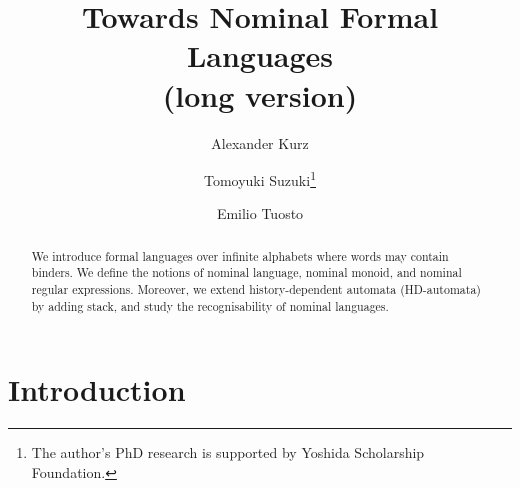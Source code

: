 \documentclass[runningheads,a4paper]{llncs}
\newcommand{\comment}[1]{}
\begin{document}
\mainmatter  

\title{Towards Nominal Formal Languages \\ (long version)}


\author{Alexander Kurz \and Tomoyuki Suzuki\thanks{The author's PhD research is supported by Yoshida Scholarship Foundation.} \and Emilio Tuosto}





\maketitle

\begin{abstract}
  We introduce formal languages over infinite alphabets where words
  may contain binders. We define the notions of nominal language,
  nominal monoid, and nominal regular expressions.  Moreover, we
  extend history-dependent automata (HD-automata) by adding stack, and
  study the recognisability of nominal languages.
\comment{
  Finally, we show how our framework can be used to model
  correctness of a cryptographic protocol models in a $\pi$-like
  calculus.
}

\end{abstract}


\section{Introduction}
\end{document}
